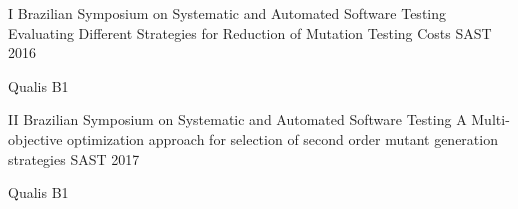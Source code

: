 \begin{cventries}
	\cventry
	{I Brazilian Symposium on Systematic and Automated Software Testing} %
	{Evaluating Different Strategies for Reduction of Mutation Testing Costs} %
	{SAST} %
	{2016} %
	{
		\begin{cvitems} %
			\item {Qualis B1}
		\end{cvitems}
	}

\end{cventries}



\begin{cventries}
	
	\cventry
	{II Brazilian Symposium on Systematic and Automated Software Testing} %
	{A Multi-objective optimization approach for selection of second order mutant generation strategies} %
	{SAST} %
	{2017} %
	{
		\begin{cvitems} %
			\item {Qualis B1}
		\end{cvitems}
	}
\end{cventries}